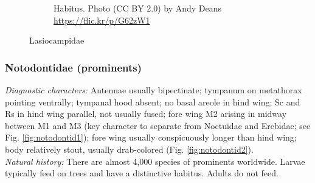 \documentclass[letterpaper, 11pt]{article}
\begin{document}
\begin{figure}[ht!]
\begin{subfigure}[ht!]{0.5\textwidth}
        \caption{Habitus. Photo (CC BY 2.0) by Andy Deans \url{https://flic.kr/p/G62zW1}}
        \label{fig:lasiocampid2}
    \end{subfigure}
    \caption{Lasiocampidae}\label{fig:lasiocampids}
\end{figure}

\subsubsection{Notodontidae (prominents)}
\noindent{}\textit{Diagnostic characters:} Antennae usually bipectinate; tympanum on metathorax pointing ventrally; tympanal hood absent; no basal areole in hind wing; Sc and Rs in hind wing parallel, not usually fused; fore wing M2 arising in midway between M1 and M3 (key character to separate from Noctuidae and Erebidae; see Fig. \ref{fig:notodontid1}); fore wing usually conspicuously longer than hind wing; body relatively stout, usually drab-colored (Fig. \ref{fig:notodontid2}).\\

\noindent{}\textit{Natural history:} There are almost 4,000 species of prominents worldwide. Larvae typically feed on trees and have a distinctive habitus. Adults do not feed.
\end{document}
